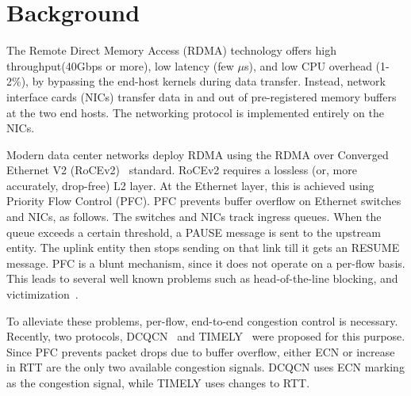 \section{Background}
The Remote Direct Memory Access (RDMA) technology offers high throughput(40Gbps
or more), low latency (few $\mu$s), and low CPU overhead (1-2\%), by bypassing
the end-host kernels during data transfer. Instead, network interface cards
(NICs) transfer data in and out of pre-registered memory buffers at the two end
hosts. The networking protocol is implemented entirely on the NICs.

Modern data center networks deploy RDMA using the RDMA over Converged Ethernet
V2 (RoCEv2)~\cite{rocev2} standard.  RoCEv2 requires a lossless (or, more
accurately, drop-free) L2 layer. At the Ethernet layer, this is achieved using
Priority Flow Control (PFC). PFC prevents buffer overflow on Ethernet switches
and NICs, as follows. The switches and NICs track ingress queues. When the queue
exceeds a certain threshold, a PAUSE message is sent to the upstream entity. The
uplink entity then stops sending on that link till it gets an RESUME message.
PFC is a blunt mechanism, since it does not operate on a per-flow basis. This
leads to several well known problems such as head-of-the-line blocking, and
victimization~\cite{dcqcn,tcp-bolt}. 

To alleviate these problems, per-flow, end-to-end congestion control is
necessary.  Recently, two protocols, DCQCN~\cite{dcqcn} and TIMELY~\cite{timely}
were proposed for this purpose. Since PFC prevents packet drops due to buffer
overflow, either ECN or increase in RTT are the only two available congestion
signals.  DCQCN uses ECN marking as the congestion signal, while TIMELY uses
changes to RTT.


